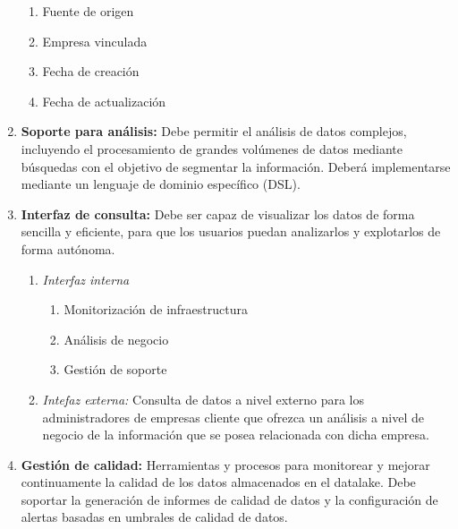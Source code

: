 \begin{enumerate}[label=RF\arabic*.]
\begin{enumerate}[label*=\arabic*.]
			\item Fuente de origen
			\item Empresa vinculada
			\item Fecha de creación
			\item Fecha de actualización
		\end{enumerate}
	\item \textbf{Soporte para análisis:} Debe permitir el análisis de datos complejos, incluyendo
		el procesamiento de grandes volúmenes de datos mediante búsquedas con el objetivo de segmentar
		la información. Deberá implementarse mediante un lenguaje de dominio específico (DSL).
	\item \textbf{Interfaz de consulta:} Debe ser capaz de visualizar los datos de forma sencilla y
		eficiente, para que los usuarios puedan analizarlos y explotarlos de forma autónoma.
		\begin{enumerate}[label*=\arabic*.]
			\item \emph{Interfaz interna}
				\begin{enumerate}[label*=\arabic*.]
					\item Monitorización de infraestructura
					\item Análisis de negocio
					\item Gestión de soporte
				\end{enumerate}
			\item \emph{Intefaz externa:} Consulta de datos a nivel externo para los administradores de
				empresas cliente que ofrezca un análisis a nivel de negocio de la información que se
				posea relacionada con dicha empresa.
		\end{enumerate}
	\item \textbf{Gestión de calidad:} Herramientas y procesos para monitorear y mejorar continuamente
		la calidad de los datos almacenados en el datalake. Debe soportar la generación de informes de
		calidad de datos y la configuración de alertas basadas en umbrales de calidad de datos.
\end{enumerate}

